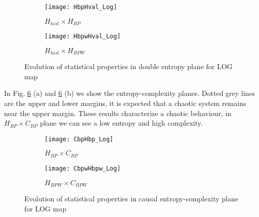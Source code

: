 \begin{figure}[htpb]
	\centering
	\begin{subfigure}[b]{0.49\textwidth}
		\texttt{[image: HbpHval\_Log]}
		\caption{$H_{hist} \times H_{BP}$}
		\label{fig:HbpHval_Log}
	\end{subfigure}
	\begin{subfigure}[b]{0.49\textwidth}
		\texttt{[image: HbpwHval\_Log]}
		\caption{$H_{hist} \times H_{BPW}$}
		\label{fig:HbpwHbp_Log}
	\end{subfigure}
	\caption{Evolution of statistical properties in double entropy plane for LOG map}
	\label{fig:LOG_HH}
\end{figure}

In Fig. \ref{fig:LOG_HC} (a) and \ref{fig:LOG_HC} (b) we show the entropy-complexity planes.
Dotted grey lines are the upper and lower margins, it is expected that a chaotic system remains near the upper margin.
These results characterize a chaotic behaviour, in $H_{BP} \times C_{BP}$ plane we can see a low entropy and high complexity.

\begin{figure}[htpb]
	\centering
	\begin{subfigure}[b]{0.49\textwidth}
		\texttt{[image: CbpHbp\_Log]}
		\caption{$H_{BP} \times C_{BP}$}
		\label{fig:CbpHbp_Log}
	\end{subfigure}
	\begin{subfigure}[b]{0.49\textwidth}
		\texttt{[image: CbpwHbpw\_Log]}
		\caption{$H_{BPW} \times C_{BPW}$}
		\label{fig:CbpwHbpw_Log}
	\end{subfigure}
	\caption{Evolution of statistical properties in causal entropy-complexity plane for LOG map}
	\label{fig:LOG_HC}
\end{figure}
